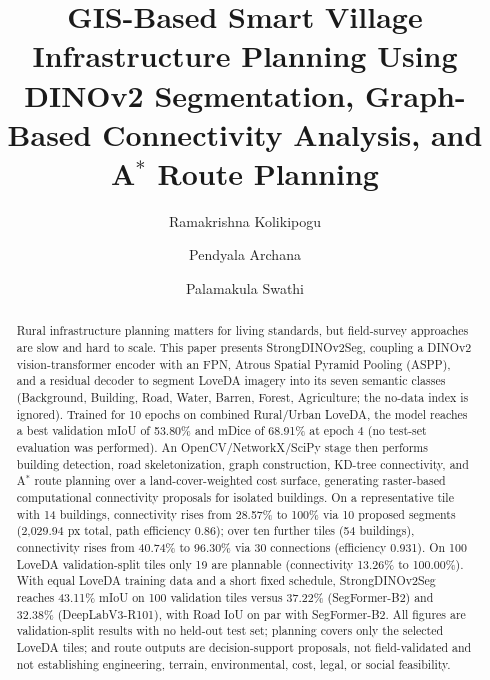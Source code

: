 \documentclass[runningheads,orivec]{llncs}
\begin{document}
%
\title{GIS-Based Smart Village Infrastructure Planning Using DINOv2 Segmentation, Graph-Based Connectivity Analysis, and A$^{*}$ Route Planning}
%
%
\author{Ramakrishna Kolikipogu\and Pendyala Archana\and Palamakula Swathi}
%
%
%
\maketitle
%
\begin{abstract}
Rural infrastructure planning matters for living standards, but field-survey approaches are slow and hard to scale. This paper presents StrongDINOv2Seg, coupling a DINOv2 vision-transformer encoder with an FPN, Atrous Spatial Pyramid Pooling (ASPP), and a residual decoder to segment LoveDA imagery into its seven semantic classes (Background, Building, Road, Water, Barren, Forest, Agriculture; the no-data index is ignored). Trained for 10 epochs on combined Rural/Urban LoveDA, the model reaches a best validation mIoU of 53.80\% and mDice of 68.91\% at epoch 4 (no test-set evaluation was performed). An OpenCV/NetworkX/SciPy stage then performs building detection, road skeletonization, graph construction, KD-tree connectivity, and A$^{*}$ route planning over a land-cover-weighted cost surface, generating raster-based computational connectivity proposals for isolated buildings. On a representative tile with 14 buildings, connectivity rises from 28.57\% to 100\% via 10 proposed segments (2,029.94 px total, path efficiency 0.86); over ten further tiles (54 buildings), connectivity rises from 40.74\% to 96.30\% via 30 connections (efficiency 0.931). On 100 LoveDA validation-split tiles only 19 are plannable (connectivity 13.26\% to 100.00\%). With equal LoveDA training data and a short fixed schedule, StrongDINOv2Seg reaches 43.11\% mIoU on 100 validation tiles versus 37.22\% (SegFormer-B2) and 32.38\% (DeepLabV3-R101), with Road IoU on par with SegFormer-B2. All figures are validation-split results with no held-out test set; planning covers only the selected LoveDA tiles; and route outputs are decision-support proposals, not field-validated and not establishing engineering, terrain, environmental, cost, legal, or social feasibility.
\end{abstract}
\end{document}
